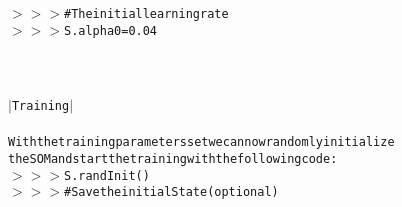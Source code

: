 {{\begin{tabbing}
{\texttt{$>$$>$$>$\hspace{6pt}\#The\hspace{6pt}initial\hspace{6pt}learning\hspace{6pt}rate}}\\
{\texttt{$>$$>$$>$\hspace{6pt}S.alpha0\hspace{6pt}=\hspace{6pt}0.04}}\\
\\
\\
{\texttt{\dash{}\dash{}\dash{}\dash{}\dash{}\dash{}\dash{}\dash{}\dash{}\dash{}\dash{}\dash{}}}\\
{\texttt{$|$\hspace{6pt}Training\hspace{6pt}$|$}}\\
{\texttt{\dash{}\dash{}\dash{}\dash{}\dash{}\dash{}\dash{}\dash{}\dash{}\dash{}\dash{}\dash{}}}\\
{\texttt{With\hspace{6pt}the\hspace{6pt}training\hspace{6pt}parameters\hspace{6pt}set\hspace{6pt}we\hspace{6pt}can\hspace{6pt}now\hspace{6pt}randomly\hspace{6pt}initialize}}\\
{\texttt{the\hspace{6pt}SOM\hspace{6pt}and\hspace{6pt}start\hspace{6pt}the\hspace{6pt}training\hspace{6pt}with\hspace{6pt}the\hspace{6pt}following\hspace{6pt}code:}}\\
{\texttt{$>$$>$$>$\hspace{6pt}S.randInit()}}\\
{\texttt{$>$$>$$>$\hspace{6pt}\#\hspace{6pt}Save\hspace{6pt}the\hspace{6pt}initial\hspace{6pt}State\hspace{6pt}(optional)}}\\

\end{tabbing}}}
